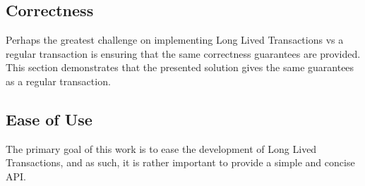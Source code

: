 \subsection{Correctness}

Perhaps the greatest challenge on implementing Long Lived Transactions
vs a regular transaction is ensuring that the same correctness
guarantees are provided. This section demonstrates that the presented
solution gives the same guarantees as a regular transaction.





\subsection{Ease of Use}

The primary goal of this work is to ease the development of Long Lived
Transactions, and as such, it is rather important to provide a simple
and concise API.
